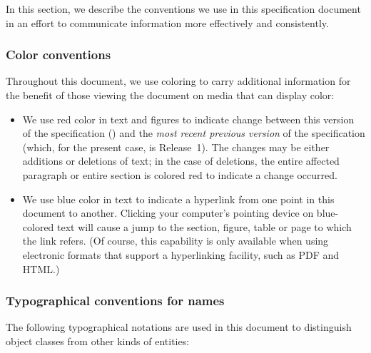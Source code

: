 \begin{blockChanged}

In this section, we describe the conventions we use in this
specification document in an effort to communicate information
more effectively and consistently.


\subsubsection{Color conventions}
\label{sec:notation-color}

Throughout this document, we use coloring to carry additional
information for the benefit of those viewing the document on media
that can display color:

\begin{itemize}

\item We use red color in text and figures to indicate change
  between this version of the specification (\thisLVR) and the
  \emph{most recent previous version} of the specification (which,
  for the present case, is \sbmltwotwo Release~1).  The changes
  may be either additions or deletions of text; in the case of
  deletions, the entire affected paragraph or entire section is
  colored red to indicate a change occurred.

\item We use blue color in text to indicate a hyperlink from one
  point in this document to another.  Clicking your computer's
  pointing device on blue-colored text will cause a jump to the
  section, figure, table or page to which the link refers.  (Of
  course, this capability is only available when using electronic
  formats that support a hyperlinking facility, such as PDF and
  HTML.)

\end{itemize}

\end{blockChanged}

\subsubsection{Typographical conventions for names}
\label{sec:notation-typographical}

The following typographical notations are used in this document to
distinguish object classes from other kinds of entities:

